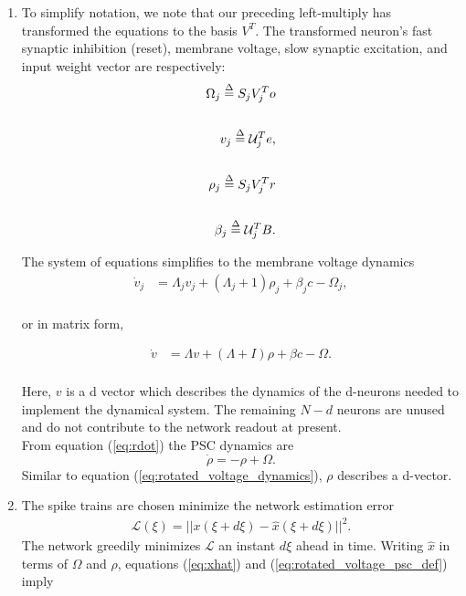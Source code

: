 \begin{enumerate}
\item To simplify notation, we note that our preceding left-multiply has transformed the equations to the basis $V^T$. The transformed neuron's fast synaptic inhibition (reset), membrane voltage, slow synaptic excitation, and input weight vector are respectively: 
\begin{align}
    \label{eq:rotated_voltage_psc_def}
    \Omega_j \overset{\Delta}{=} S_j V_j^T o \notag \\  \notag 
    \\  \notag 
    v_j \overset{\Delta}{=} 
    \mathcal{U}_j^T e, \notag  \\
    \\
    \rho_j \overset{\Delta}{=} S_j V_j^T r  \notag \\  \notag 
    \\  \notag 
    \beta_j \overset{\Delta}{=} \mathcal{U}_j^T B. \notag 
\end{align}

The system of equations simplifies to the membrane voltage dynamics
\begin{align*}
    \dot{v}_j &= 
    \Lambda_j v_j
    +
    (\Lambda_j + 1) \rho_j 
    +
     \beta_j c
    -
   \Omega_j,\\
\end{align*}

or in matrix form,

\begin{align}
\label{eq:rotated_voltage_dynamics}
    \dot{v} &= 
    \Lambda v
    +
    (\Lambda + I) \rho 
    +
     \beta c
    -
   \Omega.
   \end{align}
   \\
Here, $v$ is a d vector which describes the dynamics of the d-neurons needed to implement the dynamical system. The remaining $N-d$ neurons are unused and do not contribute to the network readout at present.   \\
From equation (\ref{eq:rdot}) the PSC dynamics are
\begin{equation}
\label{eq:rho_dot}
    \dot{\rho} = -\rho + \Omega.
\end{equation}
Similar to equation (\ref{eq:rotated_voltage_dynamics}), $\rho$ describes a d-vector. 

 
   
   
\item The spike trains are chosen minimize the network estimation error
\begin{align}
    \mathcal{L}(\xi) =  || x(\xi + d\xi) - \hat{x}(\xi + d\xi) ||^2. 
\end{align}
The network greedily minimizes $\mathcal{L}$ an instant $d\xi$ ahead in time. Writing $\hat{x}$ in terms of $\Omega$ and $\rho$, equations (\ref{eq:xhat}) and (\ref{eq:rotated_voltage_psc_def}) imply 


\end{enumerate}
